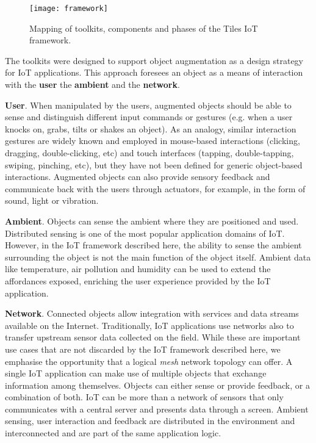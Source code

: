 \begin{figure}[ptb]
    \centering
	\texttt{[image: framework]}
	\caption{Mapping of toolkits, components and phases of the Tiles IoT framework.}
	\label{fig:framework}
\end{figure}


The toolkits were designed to support object augmentation as a design strategy for IoT applications. This approach foresees an object as a means of interaction with the \textbf{user} the \textbf{ambient} and the \textbf{network}.

\textbf{User}. When manipulated by the users, augmented objects should be able to sense and distinguish different input commands or gestures (e.g. when a user knocks on, grabs, tilts or shakes an object). As an analogy, similar interaction gestures are widely known and employed in mouse-based interactions (clicking, dragging, double-clicking, etc) and touch interfaces (tapping, double-tapping, swiping, pinching, etc), but they have not been defined for generic object-based interactions.
Augmented objects can also provide sensory feedback and communicate back with the users through actuators, for example, in the form of sound, light or vibration.

\textbf{Ambient}. Objects can sense the ambient where they are positioned and used. Distributed sensing is one of the most popular application domains of IoT. However, in the IoT framework described here, the ability to sense the ambient surrounding the object is not the main function of the object itself. Ambient data like temperature, air pollution and humidity can be used to extend the affordances exposed, enriching the user experience provided by the IoT application.

\textbf{Network}. Connected objects allow integration with services and data streams available on the Internet. Traditionally, IoT applications use networks also to transfer upstream sensor data collected on the field. While these are important use cases that are not discarded by the IoT framework described here, we emphasise the opportunity that a logical \textit{mesh} network topology can offer. A single IoT application can make use of multiple objects that exchange information among themselves. Objects can either sense or provide feedback, or a combination of both. IoT can be more than a network of sensors that only communicates with a central server and presents data through a screen. Ambient sensing, user interaction and feedback are distributed in the environment and interconnected and are part of the same application logic.


